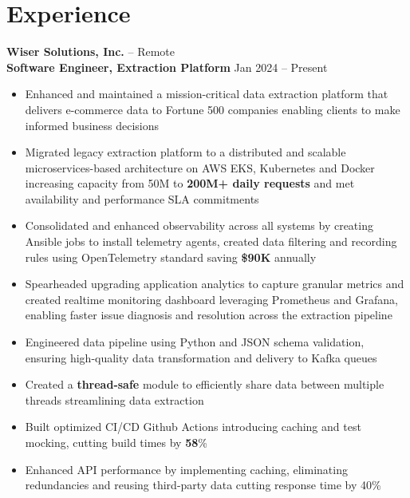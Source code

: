 \documentclass[11pt]{article}       %
\begin{document}
\section*{Experience}
\textbf{Wiser Solutions, Inc.} -- Remote \\
\textbf{Software Engineer, Extraction Platform} \hfill Jan 2024 -- Present \\
\vspace{-9pt}
\begin{itemize}
  \item Enhanced and maintained a mission-critical data extraction platform that delivers e-commerce data to Fortune 500 companies enabling clients to make informed business decisions \\
  \item Migrated legacy extraction platform to a distributed and scalable microservices-based architecture on AWS EKS, Kubernetes and Docker increasing capacity from 50M to \textbf{200M+ daily requests} and met availability and performance SLA commitments \\
  \item Consolidated and enhanced observability across all systems by creating Ansible jobs to install telemetry agents, created data filtering and recording rules using OpenTelemetry standard saving \textbf{\$90K} annually \\
  \item Spearheaded upgrading application analytics to capture granular metrics and created realtime monitoring dashboard leveraging Prometheus and Grafana, enabling faster issue diagnosis and resolution across the extraction pipeline \\
  \item Engineered data pipeline using Python and JSON schema validation, ensuring high-quality data transformation and delivery to Kafka queues \\
  \item Created a \textbf{thread-safe} module to efficiently share data between multiple threads streamlining data extraction \\
  \item Built optimized CI/CD Github Actions introducing caching and test mocking, cutting build times by \textbf{58}\% \\
  \item Enhanced API performance by implementing caching, eliminating redundancies and reusing third-party data cutting response time by 40\% \\
\end{itemize}
\end{document}
